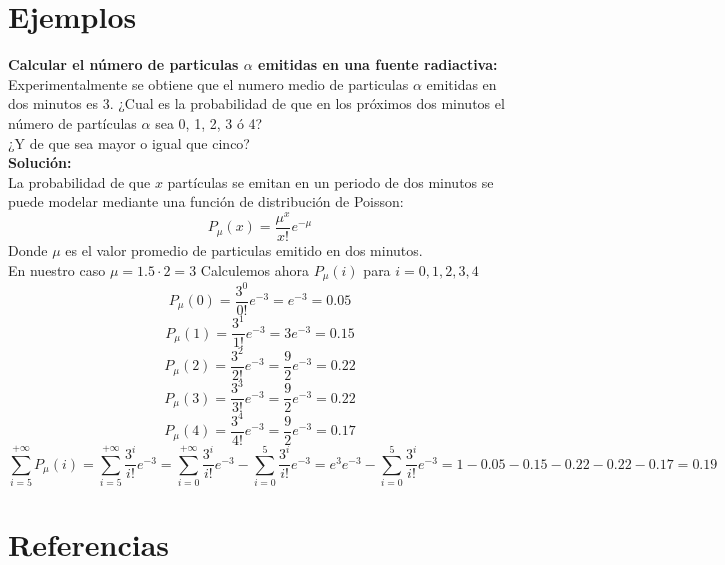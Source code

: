 \documentclass[a4paper, 10pt]{article} %
\begin{document}
\section{Ejemplos}
\textbf{Calcular el número de particulas $\alpha$ emitidas en una fuente radiactiva: \\
}Experimentalmente se obtiene que el numero medio de particulas $\alpha$ emitidas en dos minutos es 3.
¿Cual es la probabilidad de que en los próximos dos minutos el número de partículas $\alpha$ sea 0, 1, 2, 3 ó 4?\\
¿Y de que sea mayor o igual que cinco?\\
\textbf{Solución:}\\
La probabilidad de que $x$ partículas se emitan en un periodo de dos minutos se puede modelar mediante una función de distribución de Poisson:
$$ P_{\mu}(x) =\frac{\mu^x}{x!}e^{-\mu} $$
Donde $\mu$ es el valor promedio de particulas emitido en dos minutos.\\
En nuestro caso $\mu = 1.5\cdot2 = 3$ 
Calculemos ahora $P_{\mu}(i)$ para $i=0,1,2,3,4$\\
$$P_{\mu}(0) = \frac{3^0}{0!}e^{-3} = e^{-3} = 0.05 $$
$$P_{\mu}(1) = \frac{3^1}{1!}e^{-3} = 3e^{-3} = 0.15 $$
$$P_{\mu}(2) = \frac{3^2}{2!}e^{-3} = \frac{9}{2}e^{-3} = 0.22 $$
$$P_{\mu}(3) = \frac{3^3}{3!}e^{-3} = \frac{9}{2}e^{-3} = 0.22 $$
$$P_{\mu}(4) = \frac{3^4}{4!}e^{-3} = \frac{9}{2}e^{-3} = 0.17 $$
$$\sum_{i=5}^{+\infty}P_{\mu}(i) = \sum_{i=5}^{+\infty}\frac{3^i}{i!}e^{-3} = \sum_{i=0}^{+\infty}\frac{3^i}{i!}e^{-3} - \sum_{i=0}^{5}\frac{3^i}{i!}e^{-3} = e^3e^{-3} - \sum_{i=0}^{5}\frac{3^i}{i!}e^{-3} = 1 - 0.05 - 0.15 - 0.22 - 0.22 - 0.17 = 0.19$$



\section{Referencias}
\end{document}
